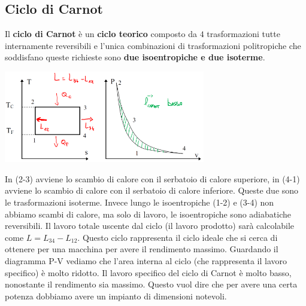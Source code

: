 \subsection{Ciclo di Carnot}
Il \textbf{ciclo di Carnot} è un \textbf{ciclo teorico} composto da $4$ trasformazioni tutte internamente reversibili e l'unica combinazioni di trasformazioni politropiche che soddisfano queste richieste sono \textbf{due isoentropiche e due isoterme}.
\begin{center}
    \includegraphics[height=4cm]{../L07/img2.PNG}
\end{center}
In (2-3) avviene lo scambio di calore con il serbatoio di calore superiore, in (4-1) avviene lo scambio di calore con il serbatoio di calore inferiore. Queste due sono le trasformazioni isoterme. Invece lungo le isoentropiche (1-2) e (3-4) non abbiamo scambi di calore, ma solo di lavoro, le isoentropiche sono adiabatiche reversibili. Il lavoro totale uscente dal ciclo (il lavoro prodotto) sarà calcolabile come $L = L_{34} - L_{12}$. \newline
\newline
Questo ciclo rappresenta il ciclo ideale che si cerca di ottenere per una macchina per avere il rendimento massimo.\newline
\newline
Guardando il diagramma P-V vediamo che l'area interna al ciclo (che rappresenta il lavoro specifico) è molto ridotto. Il lavoro specifico del ciclo di Carnot è molto basso, nonostante il rendimento sia massimo. Questo vuol dire che per avere una certa potenza dobbiamo avere un impianto di dimensioni notevoli.\newline
\newline
